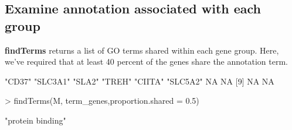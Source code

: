 \documentclass{article}
\begin{document}
\subsection*{Examine annotation associated with each group}
\textbf{findTerms} returns a list of GO terms shared within each gene group. Here, we've required that at least 40 percent of the genes share the annotation term.
\begin{Schunk}
\begin{Soutput}
 [1] "CD37"   "SLC3A1" "SLA2"   "TREH"   "CIITA"  "SLC5A2" NA       NA      
 [9] NA       NA      
\end{Soutput}
\begin{Sinput}
> findTerms(M, term_genes,proportion.shared = 0.5)
\end{Sinput}
\begin{Soutput}
[1] "protein binding"
\end{Soutput}
\end{Schunk}
\end{document}

